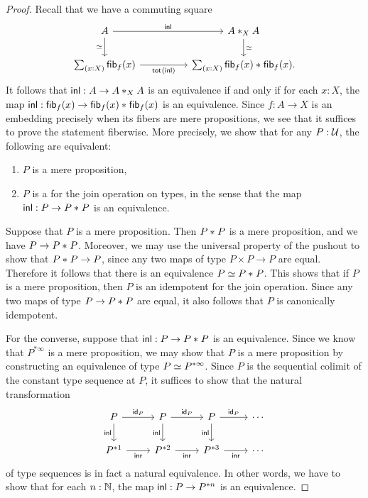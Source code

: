 \begin{proof}
Recall that we have a commuting square
\begin{equation*}
\begin{tikzcd}[column sep=huge]
A \arrow[r,"\inl"] \arrow[d,swap,"\eqvsym"] & \join[X]{A}{A} \arrow[d,"\eqvsym"] \\
\sm{x:X}\fib{f}{x} \arrow[r,swap,"\total{\inl}"] & \sm{x:X}\join{\fib{f}{x}}{\fib{f}{x}}.
\end{tikzcd}
\end{equation*}
It follows that $\inl:A\to\join[X]{A}{A}$ is an equivalence if and only if for
each $x:X$, the map $\inl:\fib{f}{x}\to\join{\fib{f}{x}}{\fib{f}{x}}$ is an
equivalence. 
Since $f:A\to X$ is an embedding precisely when its fibers are mere 
propositions, we see that it suffices to prove the statement fiberwise.
More precisely, we show that for any $P:\UU$, the following are equivalent:
\begin{enumerate}
\item $P$ is a mere proposition,
\item $P$ is a  for the join operation on types, 
in the sense that the map $\inl:P\to \join{P}{P}$ is an equivalence.
\end{enumerate}
Suppose that $P$ is a mere proposition. 
Then $\join{P}{P}$ is a mere proposition, and we have $P\to\join{P}{P}$.
Moreover, we may use the universal property of the pushout to show that
$\join{P}{P}\to P$, since any two maps of type $P\times P\to P$ are equal. 
Therefore it follows that there is an equivalence $\eqv{P}{\join{P}{P}}$.
This shows that if $P$ is a mere proposition, then $P$ is an idempotent for
the join operation. Since any two maps of type $P\to\join{P}{P}$ are equal,
it also follows that $P$ is canonically idempotent.

For the converse, suppose that $\inl:P\to\join{P}{P}$ is an equivalence. 
Since we know that $P^{\ast\infty}$ is a mere proposition, 
we may show that $P$ is a mere proposition by constructing an equivalence of
type $\eqv{P}{P^{\ast\infty}}$. 
Since $P$ is the sequential colimit of the constant
type sequence at $P$, it suffices to show that the natural transformation
\begin{equation*}
\begin{tikzcd}
P \arrow[r,"{\idfunc[P]}"] \arrow[d,swap,"\inl"] & P \arrow[r,"{\idfunc[P]}"] \arrow[d,swap,"\inl"] & P \arrow[r,"{\idfunc[P]}"] \arrow[d,swap,"\inl"] & \cdots \\
P^{\ast 1} \arrow[r,swap,"\inr"] & P^{\ast 2} \arrow[r,swap,"\inr"] & P^{\ast 3} \arrow[r,swap,"\inr"] & \cdots
\end{tikzcd}
\end{equation*}
of type sequences is in fact a natural equivalence. In other words, we have
to show that for each $n:\N$, the map $\inl:P\to P^{\ast n}$ is an equivalence.


\end{proof}
